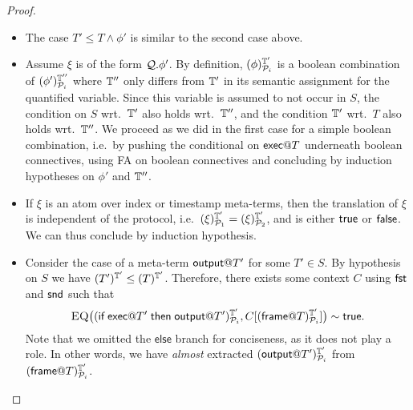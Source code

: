 \begin{proof}
\begin{itemize}
   \item
     The case $T' \leq T \wedge \phi'$ is similar to the
     second case above.
     
   \item Assume $\xi$ is of the form ${\cal Q}.\phi'$.
     By definition, $(\phi)^{\mathbb{T}'}_{\mathcal{P}_i}$
     is a boolean combination
     of $(\phi')^{\mathbb{T}''}_{\mathcal{P}_i}$
     where $\mathbb{T}''$ only differs from $\mathbb{T}'$ in its semantic assignment
     for the quantified variable.
     Since this variable is assumed to not occur in $S$,
     the condition on $S$ wrt.\ $\mathbb{T}'$ also holds wrt.\ $\mathbb{T}''$,
     and the condition $\mathbb{T}'$ wrt.\ $T$ also holds wrt.\ $\mathbb{T}''$.
     We proceed as we did in the first case for a simple boolean combination,
     i.e.\ by pushing the conditional on $\textsf{exec} @ T$ underneath boolean
     connectives, using \textsc{FA} on boolean connectives and concluding
     by induction hypotheses on $\phi'$ and $\mathbb{T}''$.
     
   \item If $\xi$ is an atom over index or timestamp meta-terms,
     then the translation of $\xi$ is independent of the protocol, i.e.\ $(\xi)^{\mathbb{T}'}_{\mathcal{P}_1} = (\xi)^{\mathbb{T}'}_{\mathcal{P}_2}$, and is either $\textsf{true}$ or $\textsf{false}$. We can thus conclude
     by induction hypothesis.
     
     
   \item Consider the case of a meta-term $\textsf{output} @ T'$ for some $T' \in S$.
     By hypothesis on $S$ we have $(T')^{\mathbb{T}'}_{} \leq (T)^{\mathbb{T}'}_{}$.
     Therefore,
     there exists some context $C$ using $\mathsf{fst}$ and $\mathsf{snd}$
     such that
     \[
       \textsc{EQ}\bigl(
       (
         \textsf{if}\; \textsf{exec} @ T' \;\textsf{then}\; \textsf{output} @ T')^{\mathbb{T}'}_{\mathcal{P}_i},
       C[(\textsf{frame} @ T)^{\mathbb{T}'}_{\mathcal{P}_i}]\bigr) \sim \textsf{true}.
     \]     
     Note that we omitted the $\mathsf{else}$ branch for conciseness, as it does not play a role.
     In other words, we have \emph{almost} extracted
     $(\textsf{output} @ T')^{\mathbb{T}'}_{\mathcal{P}_i}$ from
     $(\textsf{frame} @ T)^{\mathbb{T}'}_{\mathcal{P}_i}$.


\end{itemize}
\end{proof}
